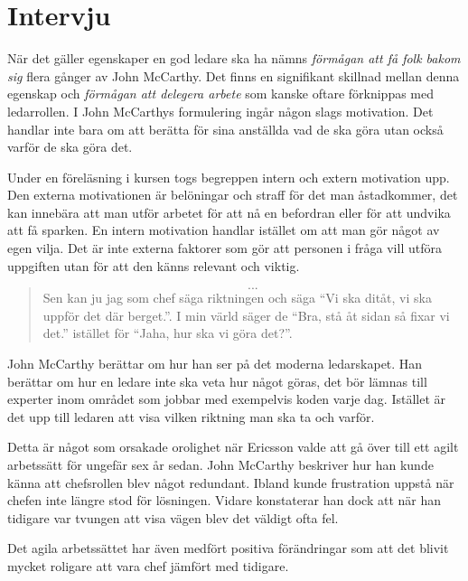 \section{Intervju}
När det gäller egenskaper en god ledare ska ha nämns \textit{förmågan att få folk bakom sig} flera gånger av John McCarthy. Det finns en signifikant skillnad mellan denna egenskap och \textit{förmågan att delegera arbete} som kanske oftare förknippas med ledarrollen. I John McCarthys formulering ingår någon slags motivation. Det handlar inte bara om att berätta för sina anställda vad de ska göra utan också varför de ska göra det.

Under en föreläsning i kursen togs begreppen intern och extern motivation upp\citep{motivation}. Den externa motivationen är belöningar och straff för det man åstadkommer, det kan innebära att man utför arbetet för att nå en befordran eller för att undvika att få sparken. En intern motivation handlar istället om att man gör något av egen vilja. Det är inte externa faktorer som gör att personen i fråga vill utföra uppgiften utan för att den känns relevant och viktig.

\begin{quote}
\[...\] Sen kan ju jag som chef säga riktningen och säga ``Vi ska ditåt, vi ska uppför det där berget.''. I min värld säger de ``Bra, stå åt sidan så fixar vi det.'' istället för ``Jaha, hur ska vi göra det?''.
\end{quote}

John McCarthy berättar om hur han ser på det moderna ledarskapet. Han berättar om hur en ledare inte ska veta hur något göras, det bör lämnas till experter inom området som jobbar med exempelvis koden varje dag. Istället är det upp till ledaren att  visa vilken riktning man ska ta och varför.

Detta är något som orsakade orolighet när Ericsson valde att gå över till ett agilt arbetssätt för ungefär sex år sedan. John McCarthy beskriver hur han kunde känna att chefsrollen blev något redundant. Ibland kunde frustration uppstå när chefen inte längre stod för lösningen. Vidare konstaterar han dock att när han tidigare var tvungen att visa vägen blev det väldigt ofta fel.

Det agila arbetssättet har även medfört positiva förändringar som att det blivit mycket roligare att vara chef jämfört med tidigare.